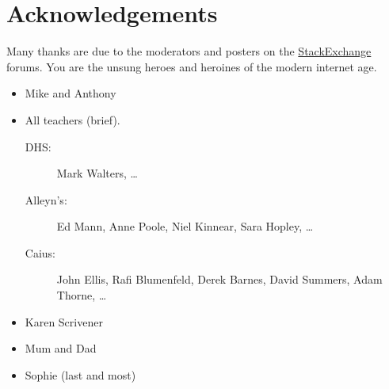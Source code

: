 \chapter*{Acknowledgements}


Many thanks are due to the moderators and posters on the \mbox{\href{http://stackexchange.com/}{StackExchange}} forums. You are the unsung heroes and heroines of the modern internet age.

\begin{itemize}
  \item Mike and Anthony
  \item All teachers (brief). 
    \begin{description}
      \item[DHS:] Mark Walters, \ldots
      \item[Alleyn's:] Ed Mann, Anne Poole, Niel Kinnear, Sara Hopley, \ldots 
      \item[Caius:] John Ellis, Rafi Blumenfeld, Derek Barnes, David Summers, Adam Thorne, \ldots
    \end{description}
  \item Karen Scrivener
  \item Mum and Dad
  \item Sophie (last and most)
\end{itemize}

\cleardoublepage{}
